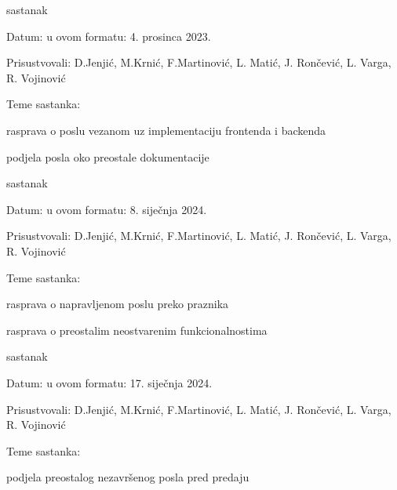 \begin{packed_enum}
			
			\item  sastanak
			\item[] \begin{packed_item}
				\item Datum: u ovom formatu: 4. prosinca 2023.
				\item Prisustvovali: D.Jenjić, M.Krnić, F.Martinović, L. Matić, J. Rončević, L. Varga, R. Vojinović
				\item Teme sastanka:
				\begin{packed_item}
					\item  rasprava o poslu vezanom uz implementaciju frontenda i backenda
					\item  podjela posla oko preostale dokumentacije
				\end{packed_item}
			\end{packed_item}
			
			\item  sastanak
			\item[] \begin{packed_item}
				\item Datum: u ovom formatu: 8. siječnja 2024.
				\item Prisustvovali: D.Jenjić, M.Krnić, F.Martinović, L. Matić, J. Rončević, L. Varga, R. Vojinović
				\item Teme sastanka:
				\begin{packed_item}
					\item  rasprava o napravljenom poslu preko praznika
					\item  rasprava o preostalim neostvarenim funkcionalnostima 
					
				\end{packed_item}
			\end{packed_item}
			
			\item  sastanak
			\item[] \begin{packed_item}
				\item Datum: u ovom formatu: 17. siječnja 2024.
				\item Prisustvovali: D.Jenjić, M.Krnić, F.Martinović, L. Matić, J. Rončević, L. Varga, R. Vojinović
				\item Teme sastanka:
				\begin{packed_item}
					\item  podjela preostalog nezavršenog posla pred predaju
					
				\end{packed_item}
			\end{packed_item}
			

\end{packed_enum}
